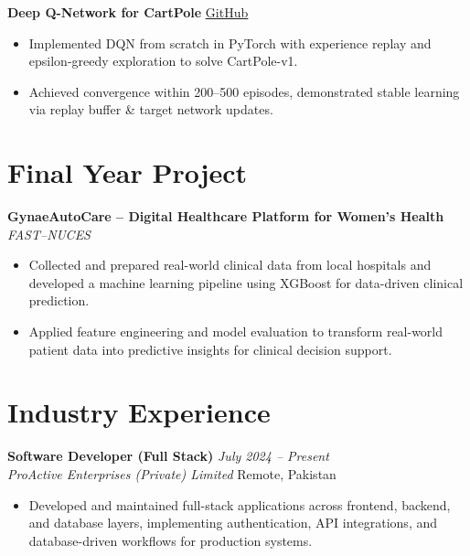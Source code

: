 \documentclass[10.5pt,a4paper]{article}
\newcommand{\entry}[4]{%
    \noindent
    \noindent\textbf{#1} \hfill \textit{#2}\\
    \textit{#3} \hfill #4\\[-1pt]
}
\begin{document}
\vspace{4pt}

\noindent\textbf{Deep Q-Network for CartPole}
\hfill
\href{https://github.com/SaadARazzaq/dqn-cartpole-pytorch}{\underline{GitHub}}
\begin{itemize}
    \item Implemented DQN from scratch in PyTorch with experience replay and epsilon-greedy exploration to solve CartPole-v1.
    \item Achieved convergence within 200--500 episodes, demonstrated stable learning via replay buffer \& target network updates.
\end{itemize}


\section*{Final Year Project}

\noindent\textbf{GynaeAutoCare -- Digital Healthcare Platform for Women's Health}
\hfill
\textit{FAST--NUCES}
\begin{itemize} \item Collected and prepared real-world clinical data from local hospitals and developed a machine learning pipeline using XGBoost for data-driven clinical prediction. \item Applied feature engineering and model evaluation to transform real-world patient data into predictive insights for clinical decision support. \end{itemize}


\section*{Industry Experience}

\entry
{Software Developer (Full Stack)}
{July 2024 -- Present}
{ProActive Enterprises (Private) Limited}
{Remote, Pakistan}

\begin{itemize}
    \item Developed and maintained full-stack applications across frontend, backend, and database layers, implementing authentication, API integrations, and database-driven workflows for production systems.
\end{itemize}
\end{document}
